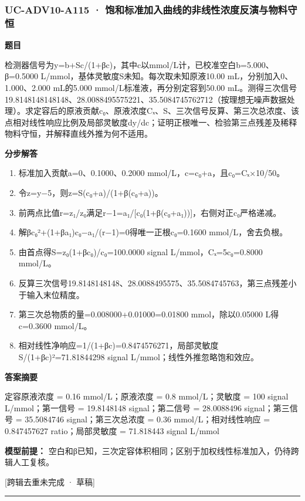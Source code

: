 \documentclass[UTF8,11pt,a4paper]{ctexart}
\begin{document}
\subsubsection*{UC-ADV10-A115 · 饱和标准加入曲线的非线性浓度反演与物料守恒}
\noindent\textbf{题目}\par
检测器信号为y=b+Sc/(1+βc)，其中c以mmol/L计，已校准空白b=5.000、β=0.5000 L/mmol，基体灵敏度S未知。每次取未知原液10.00 mL，分别加入0、1.000、2.000 mL的5.000 mmol/L标准液，再分别定容到50.00 mL。测得三次信号19.8148148148148、28.0088495575221、35.5084745762712（按理想无噪声数据处理）。求定容后的原液贡献c₀、原液浓度Cₓ、S、三次信号反算、第三次总浓度、该点相对线性响应比例及局部灵敏度dy/dc；证明正根唯一、检验第三点残差及稀释物料守恒，并解释直线外推为何不适用。\par
\medskip\noindent\textbf{分步解答}
\begin{enumerate}
\item 标准加入贡献a=0、0.1000、0.2000 mmol/L，c=c₀+a，且c₀=Cₓ×10/50。
\item 令z=y−5，则z=S(c₀+a)/(1+β(c₀+a))。
\item 前两点比值r=z₁/z₀满足r−1=a₁/[c₀(1+β(c₀+a₁))]，右侧对正c₀严格递减。
\item 解βc₀²+(1+βa₁)c₀−a₁/(r−1)=0得唯一正根c₀=0.1600 mmol/L，舍去负根。
\item 由首点得S=z₀(1+βc₀)/c₀=100.0000 signal L/mmol，Cₓ=5c₀=0.8000 mmol/L。
\item 反算三次信号19.8148148148、28.0088495575、35.5084745763，第三点残差小于输入末位精度。
\item 第三次总物质的量=0.008000+0.01000=0.01800 mmol，除以0.05000 L得c=0.3600 mmol/L。
\item 相对线性净响应=1/(1+βc)=0.8474576271，局部灵敏度S/(1+βc)²=71.81844298 signal L/mmol；线性外推忽略饱和效应。
\end{enumerate}
\noindent\textbf{答案摘要}\par
定容原液浓度 = 0.16 mmol/L；原液浓度 = 0.8 mmol/L；灵敏度 = 100 signal L/mmol；第一信号 = 19.8148148 signal；第二信号 = 28.0088496 signal；第三信号 = 35.5084746 signal；第三次总浓度 = 0.36 mmol/L；相对线性响应 = 0.847457627 ratio；局部灵敏度 = 71.818443 signal L/mmol\par
\noindent\textbf{模型前提：}
空白和β已知，三次定容体积相同；区别于加权线性标准加入，仍待跨辑人工复核。\par
\noindent\textcolor{red!65!black}{[跨辑去重未完成 · 草稿]} \par
\medskip\hrule\medskip
{}
\end{document}
